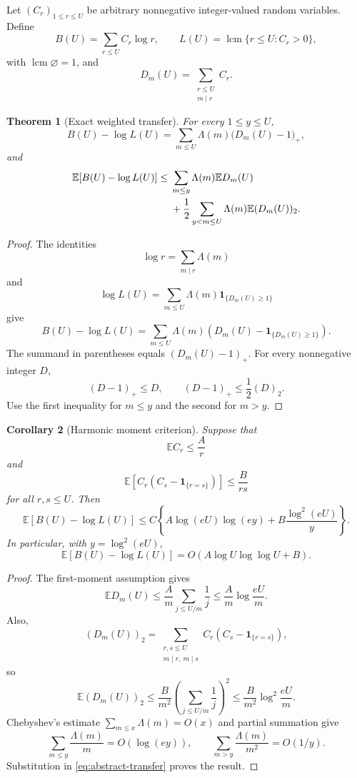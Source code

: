 \documentclass[11pt]{article}
\newtheorem{theorem}{Theorem}[section]
\newtheorem{corollary}[theorem]{Corollary}
\theoremstyle{definition}
\theoremstyle{remark}
\newcommand{\Ee}{\mathbb E}
\newcommand{\one}{\mathbf 1}
\newcommand{\lcm}{\operatorname{lcm}}
\begin{document}
Let $(C_r)_{1\le r\le U}$ be arbitrary nonnegative integer-valued random
variables.  Define
\[
 B(U)=\sum_{r\le U}C_r\log r,
 \qquad
 L(U)=\lcm\{r\le U:C_r>0\},
\]
with $\lcm\varnothing=1$, and
\[
 D_m(U)=\sum_{\substack{r\le U\\m\mid r}}C_r.
\]

\begin{theorem}[Exact weighted transfer]\label{thm:abstract-transfer}
For every $1\le y\le U$,
\[
 B(U)-\log L(U)
 =
 \sum_{m\le U}\Lambda(m)\bigl(D_m(U)-1\bigr)_+,
\]
and
\begin{align}
 \Ee[B(U)-\log L(U)]
 \le{}&
 \sum_{m\le y}\Lambda(m)\Ee D_m(U)
 \notag\\
 &+\frac12\sum_{y<m\le U}\Lambda(m)\Ee(D_m(U))_2.
 \label{eq:abstract-transfer}
\end{align}
\end{theorem}

\begin{proof}
The identities
\[
 \log r=\sum_{m\mid r}\Lambda(m)
\]
and
\[
 \log L(U)=\sum_{m\le U}\Lambda(m)\one_{\{D_m(U)\ge1\}}
\]
give
\[
 B(U)-\log L(U)
 =
 \sum_{m\le U}\Lambda(m)
 \left(D_m(U)-\one_{\{D_m(U)\ge1\}}\right).
\]
The summand in parentheses equals $(D_m(U)-1)_+$.  For every nonnegative
integer $D$,
\[
 (D-1)_+\le D,
 \qquad
 (D-1)_+\le\frac12(D)_2.
\]
Use the first inequality for $m\le y$ and the second for $m>y$.
\end{proof}

\begin{corollary}[Harmonic moment criterion]\label{cor:harmonic-transfer}
Suppose that
\[
 \Ee C_r\le\frac{A}{r}
\]
and
\[
 \Ee\!\left[C_r(C_s-\one_{\{r=s\}})\right]\le\frac{B}{rs}
\]
for all $r,s\le U$.  Then
\[
 \Ee[B(U)-\log L(U)]
 \le
 C\left\{
 A\log(eU)\log(ey)
 +B\frac{\log^2(eU)}{y}
 \right\}.
\]
In particular, with $y=\log^2(eU)$,
\[
 \Ee[B(U)-\log L(U)]
 =
 O\!\left(A\log U\log\log U+B\right).
\]
\end{corollary}

\begin{proof}
The first-moment assumption gives
\[
 \Ee D_m(U)
 \le\frac{A}{m}\sum_{j\le U/m}\frac1j
 \le\frac{A}{m}\log\frac{eU}{m}.
\]
Also,
\[
 (D_m(U))_2
 =
 \sum_{\substack{r,s\le U\\m\mid r,\ m\mid s}}
 C_r(C_s-\one_{\{r=s\}}),
\]
so
\[
 \Ee(D_m(U))_2
 \le
 \frac{B}{m^2}
 \left(\sum_{j\le U/m}\frac1j\right)^2
 \le
 \frac{B}{m^2}\log^2\frac{eU}{m}.
\]
Chebyshev's estimate $\sum_{m\le x}\Lambda(m)=O(x)$ and partial summation
give
\[
 \sum_{m\le y}\frac{\Lambda(m)}m=O(\log(ey)),
 \qquad
 \sum_{m>y}\frac{\Lambda(m)}{m^2}=O(1/y).
\]
Substitution in \eqref{eq:abstract-transfer} proves the result.
\end{proof}
\end{document}
